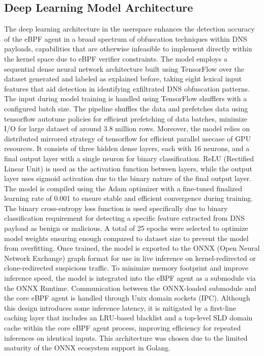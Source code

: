 \documentclass [11pt, proquest] {uwthesis}[2020/02/24]
\begin{document}
\subsection{Deep Learning Model Architecture}
\label{sec:ml}
The deep learning architecture in the userspace enhances the detection accuracy of the eBPF agent in a broad spectrum of obfuscation techniques within DNS payloads, capabilities that are otherwise infeasible to implement directly within the kernel space due to eBPF verifier constraints. The model employs a sequential dense neural network architecture built using TensorFlow over the dataset generated and labeled as explained before, taking eight lexical input features that aid detection in identifying exfiltrated DNS obfuscation patterns. The input during model training is handled using TensorFlow shufflers with a configured batch size. The pipeline shuffles the data and prefetches data using tensorflow autotune policies for efficient prefetching of data batches, minimize I/O for large dataset of around 3.8 million rows. Moreover, the model relies on distributed mirrored strategy of tensorflow for efficient parallel usecase of GPU resources.
It consists of three hidden dense layers, each with 16 neurons, and a final output layer with a single neuron for binary classification. ReLU (Rectified Linear Unit) is used as the activation function between layers, while the output layer uses sigmoid activation due to the binary nature of the final output layer. The model is compiled using the Adam optimizer with a fine-tuned finalized learning rate of 0.001 to ensure stable and efficient convergence during training. The binary cross-entropy loss function is used specifically due to binary classification requirement for detecting a specific feature extracted from DNS payload as benign or malicious. A total of 25 epochs were selected to optimize model weights ensuring enough compared to dataset size to prevent the model from overfitting. 
Once trained, the model is exported to the ONNX (Open Neural Network Exchange) graph format for use in live inference on kernel-redirected or clone-redirected suspicious traffic. To minimize memory footprint and improve inference speed, the model is integrated into the eBPF agent as a submodule via the ONNX Runtime. Communication between the ONNX-loaded submodule and the core eBPF agent is handled through Unix domain sockets (IPC). Although this design introduces some inference latency, it is mitigated by a first-line caching layer that includes an LRU-based blacklist and a top-level SLD domain cache within the core eBPF agent process, improving efficiency for repeated inferences on identical inputs. This architecture was chosen due to the limited maturity of the ONNX ecosystem support in Golang.
\end{document}

